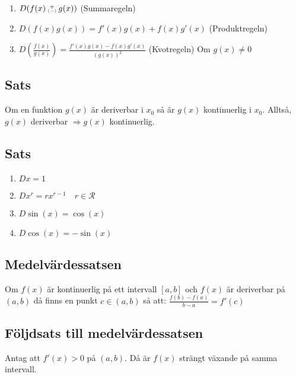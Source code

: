 \documentclass{article}
\newcommand\varpm{\mathbin{\vcenter{\hbox{%
  \oalign{\hfil$\scriptstyle+$\hfil\cr
          \noalign{\kern-.3ex}
          $\scriptscriptstyle({-})$\cr}%
}}}}
\begin{document}
\begin{enumerate}
   \item $D(f(x)\varpm g(x))$ (Summaregeln)
   \item $D(f(x)g(x))=f'(x)g(x)+f(x)g'(x)$ (Produktregeln)
   \item $D(\frac{f(x)}{g(x)})=\frac{f'(x)g(x)-f(x)g'(x)}{(g(x))^2}$ (Kvotregeln) Om $g(x)\neq 0$
\end{enumerate}

\subsection{Sats}
Om en funktion $g(x)$ är deriverbar i $x_{0}$ så är $g(x)$ kontinuerlig i $x_{0}$. Alltså,\\
$g(x)$ deriverbar $\Rightarrow g(x)$ kontinuerlig.

\subsection{Sats}
\begin{enumerate}
   \item $Dx=1$
   \item $Dx^r=rx^{r-1} \quad r \in \mathcal{R}$
   \item $D\sin(x)=\cos(x)$
   \item $D\cos(x)=-\sin(x)$
\end{enumerate}

\subsection{Medelvärdessatsen}
Om $f(x)$ är kontinuerlig på ett intervall $[a,b]$ och $f(x)$ är deriverbar på $(a,b)$ då finns en punkt $c\in (a,b)$ så att: $\frac{f(b)-f(a)}{b-a}=f'(c)$

\subsection{Följdsats till medelvärdessatsen}
Antag att $f'(x)>0$ på $(a,b)$. Då är $f(x)$ strängt växande på samma intervall.
\end{document}
